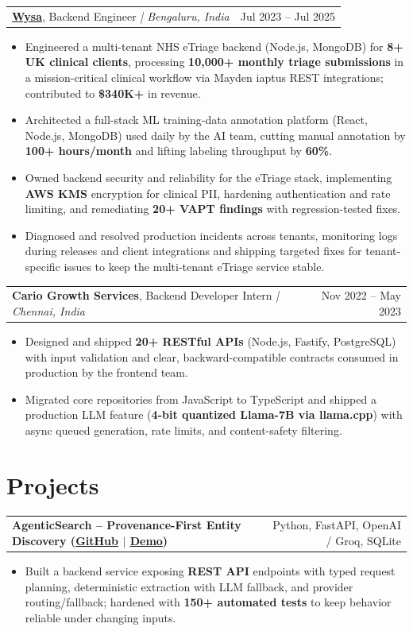 \documentclass[letterpaper,11pt]{article}
\makeatletter
\newcommand{\expItem}[4]{%
  \vspace{2pt}
  \begin{tabular*}{\textwidth}{@{}l@{\extracolsep{\fill}}r@{}}
    \textbf{#1}, #2 \textit{| #3} & #4 \\
  \end{tabular*}\par\vspace{-3pt}
}
\newcommand{\projItem}[2]{%
  \vspace{2pt}
  \begin{tabular*}{\textwidth}{@{}l@{\extracolsep{\fill}}r@{}}
    \textbf{#1} & #2 \\
  \end{tabular*}\par\vspace{-3pt}
}
\makeatother
\begin{document}
\expItem{\href{https://www.wysa.io}{Wysa}}{Backend Engineer}{Bengaluru, India}{Jul 2023 -- Jul 2025}
\begin{itemize}
  \item Engineered a multi-tenant NHS eTriage backend (Node.js, MongoDB) for \textbf{8+ UK clinical clients}, processing \textbf{10{,}000+ monthly triage submissions} in a mission-critical clinical workflow via Mayden iaptus REST integrations; contributed to \textbf{\$340K+} in revenue.
  \item Architected a full-stack ML training-data annotation platform (React, Node.js, MongoDB) used daily by the AI team, cutting manual annotation by \textbf{100+ hours/month} and lifting labeling throughput by \textbf{60\%}.
  \item Owned backend security and reliability for the eTriage stack, implementing \textbf{AWS KMS} encryption for clinical PII, hardening authentication and rate limiting, and remediating \textbf{20+ VAPT findings} with regression-tested fixes.
  \item Diagnosed and resolved production incidents across tenants, monitoring logs during releases and client integrations and shipping targeted fixes for tenant-specific issues to keep the multi-tenant eTriage service stable.
\end{itemize}

\expItem{Cario Growth Services}{Backend Developer Intern}{Chennai, India}{Nov 2022 -- May 2023}
\begin{itemize}
  \item Designed and shipped \textbf{20+ RESTful APIs} (Node.js, Fastify, PostgreSQL) with input validation and clear, backward-compatible contracts consumed in production by the frontend team.
  \item Migrated core repositories from JavaScript to TypeScript and shipped a production LLM feature (\textbf{4-bit quantized Llama-7B via llama.cpp}) with async queued generation, rate limits, and content-safety filtering.
\end{itemize}

\section{Projects}

\projItem{AgenticSearch -- Provenance-First Entity Discovery {\normalfont\small(\href{https://github.com/Deva-1903/ciir_agentic_search}{GitHub} $\vert$ \href{https://agentic-search-negglszkwa-uc.a.run.app}{Demo})}}{Python, FastAPI, OpenAI / Groq, SQLite}
\begin{itemize}
  \item Built a backend service exposing \textbf{REST API} endpoints with typed request planning, deterministic extraction with LLM fallback, and provider routing/fallback; hardened with \textbf{150+ automated tests} to keep behavior reliable under changing inputs.
\end{itemize}
\end{document}
